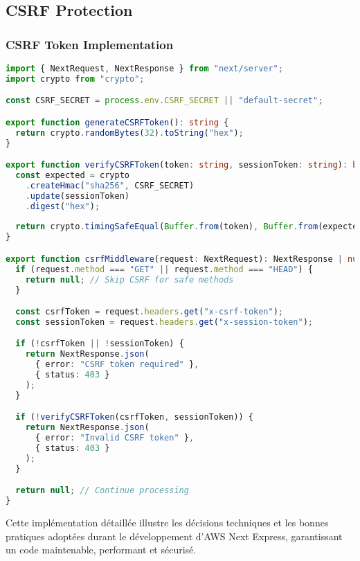 \subsection{CSRF Protection}

\subsubsection{CSRF Token Implementation}

\begin{lstlisting}[language=TypeScript, caption=Protection CSRF]
import { NextRequest, NextResponse } from "next/server";
import crypto from "crypto";

const CSRF_SECRET = process.env.CSRF_SECRET || "default-secret";

export function generateCSRFToken(): string {
  return crypto.randomBytes(32).toString("hex");
}

export function verifyCSRFToken(token: string, sessionToken: string): boolean {
  const expected = crypto
    .createHmac("sha256", CSRF_SECRET)
    .update(sessionToken)
    .digest("hex");
  
  return crypto.timingSafeEqual(Buffer.from(token), Buffer.from(expected));
}

export function csrfMiddleware(request: NextRequest): NextResponse | null {
  if (request.method === "GET" || request.method === "HEAD") {
    return null; // Skip CSRF for safe methods
  }

  const csrfToken = request.headers.get("x-csrf-token");
  const sessionToken = request.headers.get("x-session-token");

  if (!csrfToken || !sessionToken) {
    return NextResponse.json(
      { error: "CSRF token required" },
      { status: 403 }
    );
  }

  if (!verifyCSRFToken(csrfToken, sessionToken)) {
    return NextResponse.json(
      { error: "Invalid CSRF token" },
      { status: 403 }
    );
  }

  return null; // Continue processing
}
\end{lstlisting}

Cette implémentation détaillée illustre les décisions techniques et les bonnes pratiques adoptées durant le développement d'AWS Next Express, garantissant un code maintenable, performant et sécurisé. 